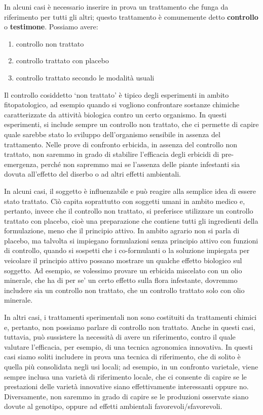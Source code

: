 \documentclass[
  12pt,
]{book}
\providecommand{\tightlist}{%
  \setlength{\itemsep}{0pt}\setlength{\parskip}{0pt}}
\begin{document}
In alcuni casi è necessario inserire in prova un trattamento che funga da riferimento per tutti gli altri; questo trattamento è comunemente detto \textbf{controllo} o \textbf{testimone}. Possiamo avere:

\begin{enumerate}
\def\labelenumi{\arabic{enumi}.}
\tightlist
\item
  controllo non trattato
\item
  controllo trattato con placebo
\item
  controllo trattato secondo le modalità usuali
\end{enumerate}

Il controllo cosiddetto `non trattato' è tipico degli esperimenti in ambito fitopatologico, ad esempio quando si vogliono confrontare sostanze chimiche caratterizzate da attività biologica contro un certo organismo. In questi esperimenti, si include sempre un controllo non trattato, che ci permette di capire quale sarebbe stato lo sviluppo dell'organismo sensibile in assenza del trattamento. Nelle prove di confronto erbicida, in assenza del controllo non trattato, non saremmo in grado di stabilire l'efficacia degli erbicidi di pre-emergenza, perché non sapremmo mai se l'assenza delle piante infestanti sia dovuta all'effetto del diserbo o ad altri effetti ambientali.

In alcuni casi, il soggetto è influenzabile e può reagire alla semplice idea di essere stato trattato. Ciò capita soprattutto con soggetti umani in ambito medico e, pertanto, invece che il controllo non trattato, si preferisce utilizzare un controllo trattato con placebo, cioè una preparazione che contiene tutti gli ingredienti della formulazione, meno che il principio attivo. In ambito agrario non si parla di placebo, ma talvolta si impiegano formulazioni senza principio attivo con funzioni di controllo, quando si sospetti che i co-formulanti o la soluzione impiegata per veicolare il principio attivo possano mostrare un qualche effetto biologico sul soggetto. Ad esempio, se volessimo provare un erbicida miscelato con un olio minerale, che ha di per se' un certo effetto sulla flora infestante, dovremmo includere sia un controllo non trattato, che un controllo trattato solo con olio minerale.

In altri casi, i trattamenti sperimentali non sono costituiti da trattamenti chimici e, pertanto, non possiamo parlare di controllo non trattato. Anche in questi casi, tuttavia, può sussistere la necessità di avere un riferimento, contro il quale valutare l'efficacia, per esempio, di una tecnica agronomica innovativa. In questi casi siamo soliti includere in prova una tecnica di riferimento, che di solito è quella più consolidata negli usi locali; ad esempio, in un confronto varietale, viene sempre inclusa una varietà di riferimento locale, che ci consente di capire se le prestazioni delle varietà innovative siano effettivamente interessanti oppure no. Diversamente, non saremmo in grado di capire se le produzioni osservate siano dovute al genotipo, oppure ad effetti ambientali favorevoli/sfavorevoli.
\end{document}
